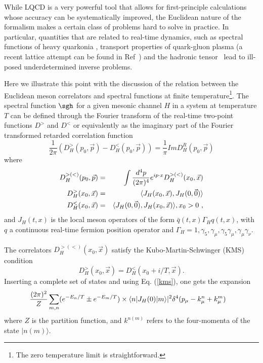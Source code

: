 \documentclass[10pt]{article}
\begin{document}
While LQCD is a very powerful tool that allows for first-principle
calculations whose accuracy can be systematically improved,
the Euclidean nature of the formalism makes a certain class of problems
hard to solve in practice. In particular, quantities that are related
to real-time dynamics, such as spectral functions of heavy quarkonia
\cite{Bazavov:2009us},
transport properties of quark-gluon plasma (a recent lattice attempt can be found
in Ref~\cite{Pasztor:2018yae})
and the hadronic tensor~\cite{Liang:2017mye}
lead to ill-posed underdetermined
inverse problems.

Here we illustrate this point with the discussion of
the relation between the
Euclidean meson correlators and spectral functions at finite
temperature\footnote{The zero temperature limit is straightforward.}.
The spectral function $\sgh$ for a given
mesonic channel $H$ in a system at temperature $T$ can be defined
through the Fourier transform of the real-time two-point functions
$D^{>}$ and $D^{<}$ or equivalently as the imaginary part of
the Fourier transformed retarded
correlation function \cite{Bellac:2011kqa}
\begin{equation}
\frac{1}{2 \pi} (D^{>}_H(p_0, \vec{p})-D^{<}_H(p_0, \vec{p}))
=\frac{1}{\pi} Im D^R_H(p_0, \vec{p}) \label{eq.defspect_1} 
\end{equation}
where
\begin{eqnarray}
D^{>(<)}_H(p_0, \vec{p}) &=& \int{d^4 p \over (2
\pi)^4} e^{i p \cdot x} D^{>(<)}_H(x_0,\vec{x}) \label{eq.defspect} \\
D^{>}_H(x_0,\vec{x}) &=& \langle
J_H(x_0, \vec{x}), J_H(0, \vec{0}) \rangle \nonumber\\
D^{<}_H(x_0,\vec{x}) &=&
\langle J_H(0, \vec{0}), J_H(x_0,\vec{x}) \rangle , x_0>0 \ ,
\end{eqnarray}
and $J_H(t,x)$ is the local meson operators of the form
$\bar q(t,x) \Gamma_H q(t,x)$, 
with $q$ a continuous real-time fermion position operator and
$\Gamma_H=1,\gamma_5, \gamma_{\mu}, \gamma_5 \gamma_{\mu}, \gamma_{\mu} \gamma_{\nu}$.

The correlators $D^{>(<)}_H(x_0,\vec{x})$ satisfy the
Kubo-Martin-Schwinger
(KMS) condition \cite{Bellac:2011kqa}
\begin{equation}
D^{>}_H(x_0,\vec{x})=D^{<}_H(x_0+i/T,\vec{x}).
\label{kms}
\end{equation}
Inserting a complete set of
states and using Eq. (\ref{kms}), one gets the expansion
\begin{eqnarray}
&
{(2 \pi)^2 \over Z} \sum_{m,n} (e^{-E_n / T} \pm e^{-E_m / T})\times 
\langle n | J_H(0) | m \rangle|^2 \delta^4(p_\mu - k^n_\mu + k^m_\mu)
\label{eq.specdef}
\end{eqnarray}
where $Z$ is the partition function, and
$k^{n(m)}$ refers to the four-momenta of the state $| n (m) \rangle $.
\end{document}
